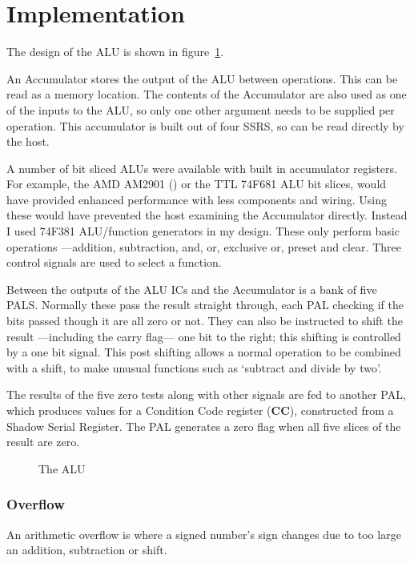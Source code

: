 \section{Implementation}

The design of the ALU is shown in figure~\ref{figure:alu}.

An Accumulator stores the output of the ALU between operations.
This can be read as a memory location.
The contents of the Accumulator are also used as one of the inputs to the ALU,
so only one other argument needs to be supplied per operation.
This accumulator is built out of four SSRS, so can be read directly by the host.

A number of bit sliced ALUs were available with built in accumulator registers. 
For example,
the AMD AM2901 (\cite{amd:logic}) or the TTL 74F681 ALU bit slices,
 would have provided enhanced performance with less components and wiring.
Using these would have prevented the host examining the Accumulator directly.
Instead I used 74F381 ALU/function generators in my design.
These  only perform basic operations ---addition, subtraction, and, or, exclusive or, preset and clear. 
Three control signals  are used to select a function.


Between the outputs of the ALU ICs and the Accumulator is a bank of five PALS.
Normally these pass the result straight through, each PAL checking if the bits passed though it are all zero or not.
They can also be instructed to shift the result ---including the carry flag--- one bit to the right; 
this shifting is controlled by a  one bit signal.
This post shifting  allows a normal operation to be combined with a shift, to make unusual functions such as `subtract and divide by two'.

The results of the five 
zero tests along with other signals are fed to another PAL, which 
produces values for a Condition Code register ({\bf CC}),  constructed from a Shadow Serial Register. 
The PAL generates a zero flag  when all five slices of the result are zero.

\begin{figure}
\vspace{20cm}
\caption{The ALU}
\label{figure:alu}
\end{figure}

\subsubsection{Overflow}

An arithmetic overflow is where  a signed number's sign changes due to too large an addition, subtraction or shift.

